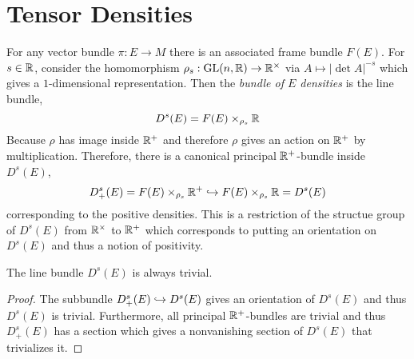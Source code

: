 \documentclass[12pt]{article}
\begin{document}
\section{Tensor Densities}

\begin{defn}
For any vector bundle $\pi : E \to M$ there is an associated frame bundle $F(E)$. For $s \in \mathbb{R}$, consider the homomorphism $\rho_s : \mathrm{GL}(n,\mathbb{R}) \to \mathbb{R}^\times$ via $A \mapsto |\det{A}|^{-s}$ which gives a $1$-dimensional representation. Then the \textit{bundle of $E$ densities} is the line bundle,
\[ D^s(E) = F(E) \times_{\rho_s} \mathbb{R} \]
Because $\rho$ has image inside $\mathbb{R}^+$ and therefore $\rho$ gives an action on $\mathbb{R}^+$ by multiplication. Therefore, there is a canonical principal $\mathbb{R}^+$-bundle inside $D^s(E)$,
\[ D_+^s(E) = F(E) \times_{\rho_s} \mathbb{R}^+ \hookrightarrow F(E) \times_{\rho_s} \mathbb{R} = D^s(E) \]
corresponding to the positive densities. This is a restriction of the structue group of $D^s(E)$ from $\mathbb{R}^\times$ to $\mathbb{R}^+$ which corresponds to putting an orientation on $D^s(E)$ and thus a notion of positivity.
\end{defn}

\begin{prop}
The line bundle $D^s(E)$ is always trivial.
\end{prop}

\begin{proof}
The subbundle $D^s_+(E) \hookrightarrow D^s(E)$ gives an orientation of $D^s(E)$ and thus $D^s(E)$ is trivial. Furthermore, all principal $\mathbb{R}^+$-bundles are trivial and thus $D^s_+(E)$ has a section which gives a nonvanishing section of $D^s(E)$ that trivializes it.
\end{proof}
\end{document}
